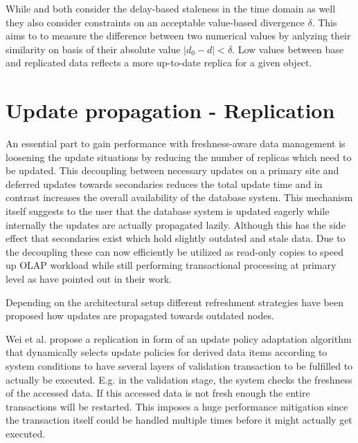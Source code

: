 While \cite{xiang:2008} and \cite{fekete:2018} both consider the delay-based staleness in the time domain as well they also consider constraints on 
an acceptable value-based divergence $\delta$. This aims to to measure the difference between two numerical values by anlyzing their similarity on basis of their 
absolute value $|d_0 - d| < \delta $. Low values between base and replicated data reflects a more up-to-date replica for a given object.




\section{Update propagation - Replication}
\label{r:replication}
An essential part to gain performance with freshness-aware data management is loosening the update situations by reducing the number of 
replicas which need to be updated. This decoupling between necessary updates on a primary site and deferred updates towards secondaries 
reduces the total update time and in contrast increases the overall availability of the database system.
This mechanism itself suggests to the user that the database system is updated eagerly while internally the updates are actually propagated lazily. 
Although this has the side effect that secondaries exist which hold slightly outdated and stale data. 
Due to the decoupling these can now efficiently be utilized as read-only copies to speed up OLAP workload while still performing transactional processing 
at primary level as \cite{psaroudakis:2015} \cite{rohm:2002} \cite{xiang:2008} have pointed out in their work.

Depending on the architectural setup different refreshment strategies have been proposed how updates are propagated towards outdated nodes.

Wei et al. \cite{wei:2004} propose a replication in form of an update policy adaptation algorithm that dynamically selects update policies
for derived data items according to system conditions to have several layers of validation transaction to be fulfilled to actually be executed.
E.g. in the validation stage, the system checks the freshness of the accessed data. If this accessed data is not fresh enough the entire transactions will be restarted.
This imposes a huge performance mitigation since the transaction itself could be handled multiple times before it might actually get executed.

